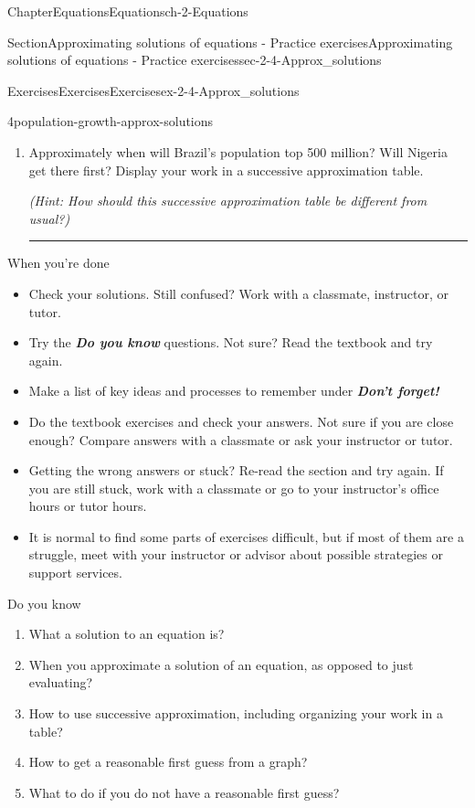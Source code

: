 \documentclass[twoside,11pt,]{book}
\newcommand{\alert}[1]{\textbf{\textit{#1}}}
\newlength{\workspacestrutwidth}
\numberwithin{equation}{section}
\begin{document}
\begin{chapterptx}{Chapter}{Equations}{}{Equations}{}{}{ch-2-Equations}
\begin{sectionptx}{Section}{Approximating solutions of equations - Practice exercises}{}{Approximating solutions of equations - Practice exercises}{}{}{sec-2-4-Approx_solutions}
\begin{exercises-subsection-numberless}{Exercises}{Exercises}{}{Exercises}{}{}{ex-2-4-Approx_solutions}
\begin{divisionexercise}{4}{}{}{population-growth-approx-solutions}
\begin{enumerate}[label=(\alph*),ref=\alph*]
\item{}Approximately when will Brazil's population top 500 million? Will Nigeria get there first? Display your work in a successive approximation table.%
\par
\emph{(Hint: How should this successive approximation table be different from usual?)}%
\par\rule{\workspacestrutwidth}{1.25in}%
\end{enumerate}%
\end{divisionexercise}%
\end{exercises-subsection-numberless}
\begin{conclusion}{When you're done \textellipsis{}}%
%
\begin{itemize}[label=\textbullet]
\item{}Check your solutions. Still confused? Work with a classmate, instructor, or tutor.%
\item{}Try the \alert{Do you know} questions. Not sure? Read the textbook and try again.%
\item{}Make a list of key ideas and processes to remember under \alert{Don't forget!}%
\item{}Do the textbook exercises and check your answers. Not sure if you are close enough? Compare answers with a classmate or ask your instructor or tutor.%
\item{}Getting the wrong answers or stuck? Re-read the section and try again. If you are still stuck, work with a classmate or go to your instructor's office hours or tutor hours.%
\item{}It is normal to find some parts of exercises difficult, but if most of them are a struggle, meet with your instructor or advisor about possible strategies or support services.%
\end{itemize}
%
\end{conclusion}%
\begin{conclusion}{Do you know \textellipsis{}}%
%
\begin{enumerate}[label={\Alph*.}]
\item{}What a solution to an equation is?%
\item{}When you approximate a solution of an equation, as opposed to just evaluating?%
\item{}How to use successive approximation, including organizing your work in a table?%
\item{}How to get a reasonable first guess from a graph?%
\item{}What to do if you do not have a reasonable first guess?%

\end{enumerate}
\end{conclusion}
\end{sectionptx}
\end{chapterptx}
\end{document}
